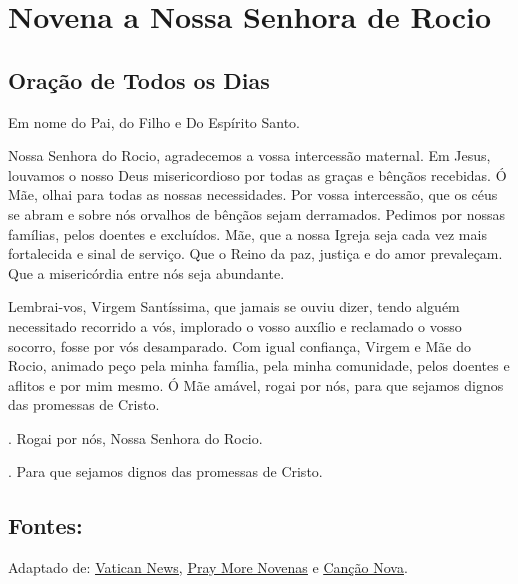 \documentclass[a4paper,14pt,twoside]{extarticle} \usepackage[utf8]{inputenc}
\makeatletter
\newcommand{\vers@resp@sym}{%
  \raisebox{0.2ex}{\rotatebox[origin=c]{-20}{$\m@th\rceil$}}%
}
\newcommand{\vers@resp}[2]{%
  {\ooalign{%
     \hidewidth\kern#1\vers@resp@sym\hidewidth\cr
     #2\cr
  }}%
}
\DeclareRobustCommand{\versicle}{\vers@resp{-0.1em}{\textbf{V}}}
\DeclareRobustCommand{\response}{\vers@resp{0pt}{\textbf{R}}}
\makeatother
\begin{document}
\newpage


\section{Novena a Nossa Senhora de Rocio}
\subsection*{Oração de Todos os Dias}
Em nome do Pai, do Filho e Do Espírito Santo.

Nossa Senhora do Rocio, agradecemos a vossa intercessão maternal. Em Jesus, louvamos o nosso Deus misericordioso por todas as graças e bênçãos recebidas. Ó Mãe, olhai para todas as nossas necessidades. Por vossa intercessão, que os céus se abram e sobre nós orvalhos de bênçãos sejam derramados. Pedimos por nossas famílias, pelos doentes e excluídos. Mãe, que a nossa Igreja seja cada vez mais fortalecida e sinal de serviço. Que o Reino da paz, justiça e do amor prevaleçam. Que a misericórdia entre nós seja abundante.

Lembrai-vos, Virgem Santíssima, que jamais se ouviu dizer, tendo alguém necessitado recorrido a vós, implorado o vosso auxílio e reclamado o vosso socorro, fosse por vós desamparado. Com igual confiança, Virgem e Mãe do Rocio, animado peço pela minha família, pela minha comunidade, pelos doentes e aflitos e por mim mesmo. Ó Mãe amável, rogai por nós, para que sejamos dignos das promessas de Cristo.

\vspace{1cm}

\versicle. Rogai por nós, Nossa Senhora do Rocio.

\response. Para que sejamos dignos das promessas de Cristo.

\vfill

\begin{center}
\subsection*{Fontes:}
Adaptado de: 
 \underline{\href{https://www.vaticannews.va/pt/santo-do-dia/11/11/s--martinho--bispo-de-tours-.html}{Vatican News}}, \underline{\href{https://www.praymorenovenas.com/st-martin-of-tours-novena}{Pray More Novenas}} e \underline{\href{https://santo.cancaonova.com/santo/sao-martinho-de-tours-o-dono-do-manto-que-cobriu-jesus/}{Canção Nova}}.
\end{center}
\end{document}
